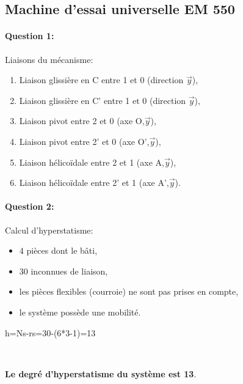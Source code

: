 \subsection{Machine d'essai universelle EM 550}

\paragraph{Question 1:} Liaisons du mécanisme:
\begin{enumerate}
 \item Liaison glissière en C entre 1 et 0 (direction $\overrightarrow{y}$),
 \item Liaison glissière en C' entre 1 et 0 (direction $\overrightarrow{y}$),
 \item Liaison pivot entre 2 et 0 (axe O,$\overrightarrow{y}$),
 \item Liaison pivot entre 2' et 0 (axe O',$\overrightarrow{y}$),
 \item Liaison hélicoïdale entre 2 et 1 (axe A,$\overrightarrow{y}$),
 \item Liaison hélicoïdale entre 2' et 1 (axe A',$\overrightarrow{y}$).
\end{enumerate}

\paragraph{Question 2:} Calcul d'hyperstatisme:
\begin{itemize}
 \item $4$ pièces dont le bâti,
 \item $30$ inconnues de liaison,
 \item les pièces flexibles (courroie) ne sont pas prises en compte,
 \item le système possède une mobilité.
\end{itemize}

h=Ns-rs=30-(6*3-1)=13

~\

\textbf{Le degré d'hyperstatisme du système est 13}.

